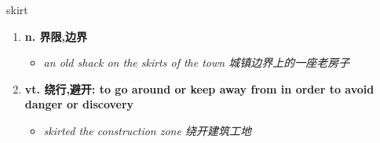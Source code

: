 
\begin{frame}
{\huge skirt}
\begin{center}
\begin{enumerate}\Large
  \item \textbf{n. 界限,边界}
  \begin{itemize}
    \item \em{\Large{an old shack on the skirts of the town 城镇边界上的一座老房子}}
  \end{itemize}
  \item \textbf{vt. 绕行,避开: to go around or keep away from in order to avoid danger or discovery}
  \begin{itemize}
    \item \em{\Large{skirted the construction zone 绕开建筑工地}}
  \end{itemize}
\end{enumerate}
\end{center}
\end{frame}
